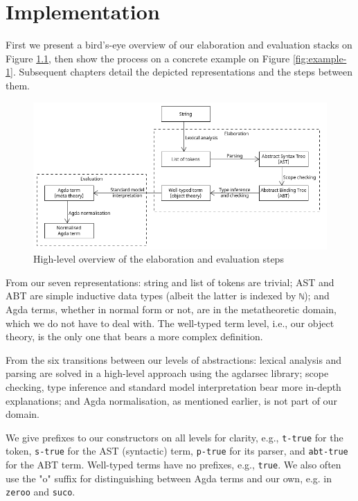 \chapter{Implementation}
\label{ch:Implementation}

First we present a bird's-eye overview of our elaboration and evaluation stacks on Figure \ref{fig:architecture}, then show the process on a concrete example on Figure \ref{fig:example-1}. Subsequent chapters detail the depicted representations and the steps between them.

\begin{figure}[h!]
	\centering
	\includegraphics[width=1.0\textwidth]{../images/architecture.png}
	\caption{High-level overview of the elaboration and evaluation steps}
	\label{fig:architecture}
\end{figure}

From our seven representations: string and list of tokens are trivial; AST and ABT are simple inductive data types (albeit the latter is indexed by \verb$ℕ$); and Agda terms, whether in normal form or not, are in the metatheoretic domain, which we do not have to deal with. The well-typed term level, i.e., our object theory, is the only one that bears a more complex definition.

From the six transitions between our levels of abstractions: lexical analysis and parsing are solved in a high-level approach using the agdarsec library; scope checking, type inference and standard model interpretation bear more in-depth explanations; and Agda normalisation, as mentioned earlier, is not part of our domain.

We give prefixes to our constructors on all levels for clarity, e.g., \verb$t-true$ for the token, \verb$s-true$ for the AST (syntactic) term, \verb$p-true$ for its parser, and \verb$abt-true$ for the ABT term. Well-typed terms have no prefixes, e.g., \verb$true$. We also often use the "o" suffix for distinguishing between Agda terms and our own, e.g. in \verb$zeroo$ and \verb$suco$.

